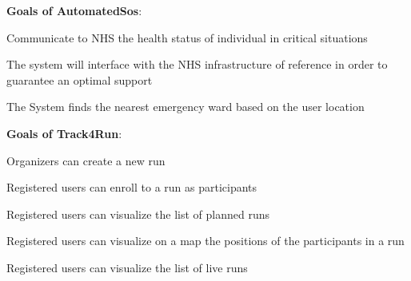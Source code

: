 \begin{goalList}
\begin{enumerate}[label={[}G3.\arabic*{]}]
\end{enumerate}

\textbf{Goals of AutomatedSos}:
\begin{enumerate}[label={[}G4.\arabic*{]}]

    \item \label{goal:sos1}Communicate to NHS the health status of individual in critical     situations
    \item \label{goal:sos2}The system will interface with the NHS infrastructure of         reference in order to guarantee an optimal support
    \item \label{goal:sos3}The System finds the nearest emergency ward based on the user     location
    
\end{enumerate}
\newpage

\textbf{Goals of Track4Run}:
\begin{enumerate}[label={[}G5.\arabic*{]}]

    \item \label{goal:run1}Organizers can create a new run
    \item \label{goal:run2}Registered users can enroll to a run as participants
    \item \label{goal:run3}Registered users can visualize the list of planned runs
    \item \label{goal:run4}Registered users can visualize on a map the positions of the        participants in a run
    \item\label{goal:run5}Registered users can visualize the list of live runs
    
\end{enumerate}
\end{goalList}

